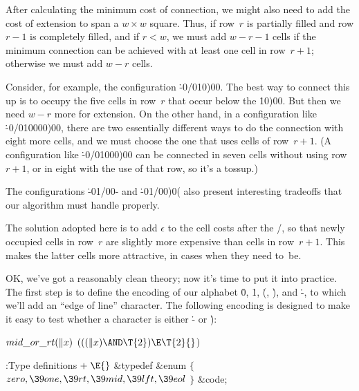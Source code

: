 \fi

After calculating the minimum cost of connection, we might also need to
add the cost of extension to span a $w\times w$ square. Thus, if row~$r$
is partially filled and row $r-1$ is completely filled, and if $r<w$,
we must add $w-r-1$ cells if the minimum connection can be achieved with at
least one cell in row~$r+1$; otherwise we must add $w-r$ cells.

Consider, for example, the configuration \.{-0\caret/010)00}. The best way
to connect this up is to occupy the five cells in row~$r$ that occur below the
\.{10)00}. But then we need $w-r$ more for extension. On the other hand,
in a configuration like \.{-0\caret/010000)00}, there are two essentially
different ways to do the connection with eight more cells, and we must choose
the one that uses cells of row~$r+1$. (A configuration like
\.{-0\caret/01000)00} can be connected in seven cells without using
row $r+1$, or in eight with the use of that row, so it's a tossup.)

The configurations \.{-01\caret/00-} and \.{-01\caret/00)0(} also
present interesting tradeoffs that our algorithm must handle properly.

The solution adopted here is to add $\epsilon$ to the cell costs after
the \qcaret/, so that newly occupied cells in row~$r$
are slightly more expensive than cells in row~$r+1$. This makes the
latter cells more attractive, in cases when they need to~be.

\fi

OK, we've got a reasonably clean theory; now it's time to put it into
practice. The first step is to define the encoding of our alphabet
\.0, \.1, \.(, \.), and \.-, to which we'll add an ``edge of line''
character. The following encoding is designed to make it easy to test
whether a character is either \.- or \.):

\Y\B\4\D$\\{mid\_or\_rt}(\|x)$ \5
$(((\|x)\AND\T{2})\E\T{2}{}$)\par
\Y\B\4:Type definitions\X${}\mathrel+\E{}$\6
\&{typedef} \&{enum} ${}\{{}$\1\6
${}\\{zero},\39\\{one},\39\\{rt},\39\\{mid},\39\\{lft},\39\\{eol}{}$\2\6
${}\}{}$ \&{code};\par
\fi

